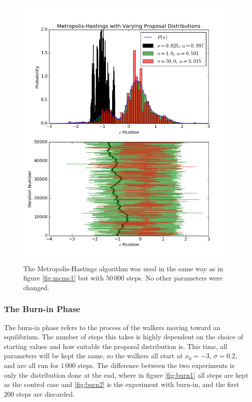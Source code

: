 \begin{figure}
  \centering
  \includegraphics[width=\linewidth]{mcmc2.png}
  \caption{
    The Metropolis-Hastings algorithm was used in the same way as in figure
    \ref{fig:mcmc1} but with $50\,000$ steps. No other parameters were changed.
  }
  \label{fig:mcmc2}
\end{figure}

\subsubsection{The Burn-in Phase}
The burn-in phase refers to the process of the walkers moving toward an
equilibrium. The number of steps this takes is highly dependent on the choice of
starting values and how suitable the proposal distribution is. This time, all
parameters will be kept the same, so the walkers all start at $x_0 = -3$,
$\sigma = 0.2$, and are all run for $1\,000$ steps. The difference between the
two experiments is only the distribution done at the end, where in figure
\ref{fig:burn1} all steps are kept as the control case and \ref{fig:burn2} is
the experiment with burn-in, and the first $200$ steps are discarded.


